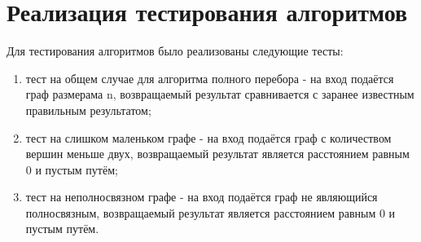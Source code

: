 \section{Реализация тестирования алгоритмов}

Для тестирования алгоритмов было реализованы следующие тесты:
\begin{enumerate}
	\item тест на общем случае для алгоритма полного перебора  - на вход подаётся граф размерама n, возвращаемый результат сравнивается с заранее известным правильным результатом;
	\item тест на слишком маленьком графе - на вход подаётся граф с количеством вершин меньше двух, возвращаемый результат является расстоянием равным 0 и пустым путём;
	\item тест на неполносвязном  графе - на вход подаётся граф не являющийся полносвязным, возвращаемый результат является расстоянием равным 0 и пустым путём.
\end{enumerate}

